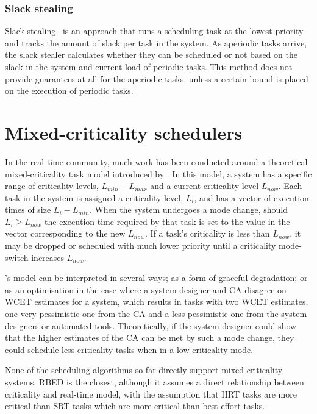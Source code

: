 \subsubsection{Slack stealing}

Slack stealing~\citep{Ramos_Thuel_Lehoczky_93} is an approach that runs a scheduling
task at the lowest priority and tracks the amount of slack per task in the system.  As aperiodic
tasks arrive, the slack stealer calculates whether they can be scheduled or not based on the slack
in the system and current load of periodic tasks.  This method does not provide guarantees at all
for the aperiodic tasks, unless a certain bound is placed on the execution of periodic tasks.

\section{Mixed-criticality schedulers}
\label{sched:mixed-criticality-schedulers}

In the real-time community, much work has been conducted around a theoretical mixed-criticality task
model introduced by \citet{Vestal_07}.  In this model, a system has a specific range of criticality
levels, $L_{min}-L_{max}$ and a current criticality level $L_{now}$. Each task in the system is
assigned a criticality level, $L_{i}$, and has a vector of execution times of size $L_{i}-L_{min}$.
When the system undergoes a mode change, should $L_{i} \geq L_{now}$ the execution time required by
that task is set to the value in the vector corresponding to the new $L_{now}$. If a task's
criticality is less than $L_{now}$, it may be dropped or scheduled with much lower priority until
a criticality mode-switch increases $L_{now}$.

\citet{Vestal_07}'s model can be interpreted in several ways; as a form of graceful degradation; or as an
optimisation in the case where a system designer and \gls{CA} disagree on \gls{WCET}
estimates for a system, which results in tasks with two {\gls{WCET}} estimates, one very pessimistic one from
the \gls{CA} and a less pessimistic one from the system designers or automated tools. 
Theoretically, if the system designer could show that the higher estimates
of the \gls{CA} can be met by such a mode change, they could schedule less criticality tasks
when in a low criticality mode. 

None of the scheduling algorithms so far directly support mixed-criticality systems.  \gls{RBED} is
the closest, although it assumes a direct relationship between criticality and real-time model, with
the assumption that \gls{HRT} tasks are more critical than \gls{SRT} tasks which are more critical
than best-effort tasks. 

